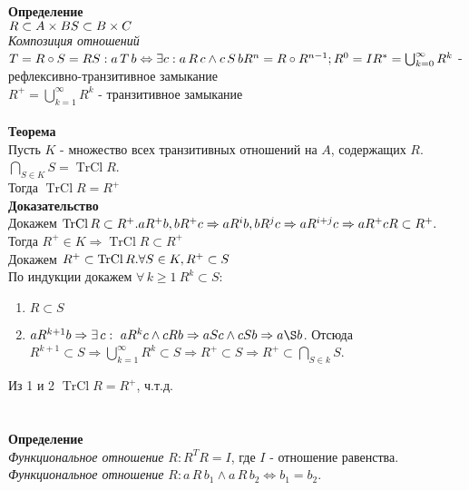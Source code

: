 \documentclass[12pt]{article}
\begin{document}
\textbf{Определение}\\
$R \subset A \times B\\
S \subset B \times C$\\
\textit{Композиция отношений} $T=R\circ S = RS: a\,T\,b \Leftrightarrow \exists c: a\,R\,c \land c\,S\,b\\
R^n = R\circ R^{n-1}; R^0=I\\
R^*=\bigcup_{k=0}^\infty R^k$ - рефлексивно-транзитивное замыкание\\
$R^+=\bigcup_{k=1}^\infty R^k$ - транзитивное замыкание\\\\
\textbf{Теорема}\\
Пусть $K$ - множество всех транзитивных отношений на $A$, содержащих $R$.\\
$\bigcap_{S\in K}S = \operatorname{TrCl} R$.\\
Тогда $\operatorname{TrCl} R = R^+$\\
\textbf{Доказательство}\\
Докажем $\operatorname{TrCl} R \subset R^+.\\
a R^+ b, b R^+ c \Rightarrow a R^i b, b R^j c \Rightarrow a R^{i+j} c \Rightarrow a R^+ c\\
R \subset R^+.$\\
Тогда $R^+ \in K \Rightarrow \operatorname{TrCl} R \subset R^+$\\
Докажем $R^+ \subset \operatorname{TrCl} R.\\
\forall S \in K, R^+ \subset S$\\
По индукции докажем $\forall\,k\geq 1\ R^k\subset S:$\\
\begin{enumerate}
    \item $R \subset S$
    \item $a R^{k+1} b \Rightarrow \exists\,c:\ a R^k c \land c R b \Rightarrow a S c \land c S b \Rightarrow a \S b$. Отсюда $R^{k+1} \subset S \Rightarrow \bigcup_{k=1}^\infty R^k \subset S \Rightarrow R^+ \subset S \Rightarrow R^+ \subset \bigcap_{S \in k} S$.
\end{enumerate}
Из 1 и 2 $\operatorname{TrCl} R = R^+$, ч.т.д.\\\\\\
\textbf{Определение}\\
\textit{Функциональное отношение} $R: R^TR=I$, где $I$ - отношение равенства.\\
\textit{Функциональное отношение} $R: a\,R\,b_1 \land a\,R\,b_2 \Leftrightarrow b_1 = b_2$.\\\\
\end{document}
